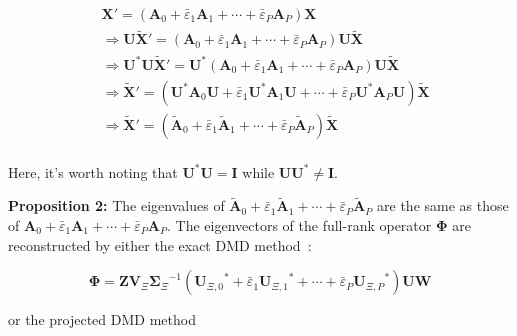 \begin{equation}
    \begin{aligned}
    & \mathbf{X'}=({\mathbf{A}_{0}}+{{\bar{\varepsilon}}_{1}}{\mathbf{A}_{1}}+\cdots+{{\bar{\varepsilon }}_{P}}{\mathbf{A}_{P}})\mathbf{X} \\ 
    & \Rightarrow \mathbf{U\tilde{X}'}=({\mathbf{A}_{0}}+{{\bar{\varepsilon }}_{1}}{\mathbf{A}_{1}}+\cdots+{{\bar{\varepsilon}}_{P}}{\mathbf{A}_{P}})\mathbf{U\tilde{X}} \\ 
    & \Rightarrow {\mathbf{U}^{*}}\mathbf{U\tilde{X}'}={\mathbf{U}^{*}}({\mathbf{A}_{0}}+{{\bar{\varepsilon }}_{1}}{\mathbf{A}_{1}}+\cdots+{{\bar{\varepsilon}}_{P}}{\mathbf{A}_{P}})\mathbf{U\tilde{X}} \\ 
    & \Rightarrow \mathbf{\tilde{X}'}=({\mathbf{U}^{*}}{\mathbf{A}_{0}}\mathbf{U}+{{\bar{\varepsilon}}_{1}}{\mathbf{U}^{*}}{\mathbf{A}_{1}}\mathbf{U}+\cdots+{{\bar{\varepsilon}}_{P}}{\mathbf{U}^{*}}{\mathbf{A}_{P}}\mathbf{U})\mathbf{\tilde{X}} \\ 
    & \Rightarrow \mathbf{\tilde{X}'}=({{\mathbf{\tilde{A}}}_{0}}+{{\bar{\varepsilon }}_{1}}{{\mathbf{\tilde{A}}}_{1}}+\cdots+{{\bar{\varepsilon}}_{P}}{{\mathbf{\tilde{A}}}_{P}})\mathbf{\tilde{X}} \\ 
    \end{aligned} \label{eqS9}
\end{equation}

Here, it’s worth noting that ${\mathbf{U}^\text{*}}\mathbf{U}=\mathbf{I}$ while $\mathbf{U}{\mathbf{U}^\text{*}}\ne \mathbf{I}$.

\textbf{Proposition 2:} The eigenvalues of $\mathbf{\tilde{A}}_{0}+{\bar{\varepsilon}_{1}}{\mathbf{\tilde{A}}_{1}}+\cdots+{\bar{\varepsilon}_{P}}{\mathbf{\tilde{A}}_{P}}$ are the same as those of ${\mathbf{A}_{0}}+{\bar{\varepsilon}_{1}}{\mathbf{A}_{1}}+\cdots+{\bar{\varepsilon}_{P}}{\mathbf{A}_{P}}$. The eigenvectors of the full-rank operator $\mathbf{\Phi}$ are reconstructed by either the exact DMD method~\cite{tu2013dynamic,brunton2022data}:

\begin{equation}
    \mathbf{\Phi}=\mathbf{Z}{\mathbf{V}_{\Xi}}{\mathbf{\Sigma}_{\Xi}}^{-1}({\mathbf{U}_{\Xi,0}}^\text{*}+{\bar{\varepsilon}_{1}}{\mathbf{U}_{\Xi,1}}^\text{*}+\cdots+{\bar{\varepsilon}_{P}}{\mathbf{U}_{\Xi,P}}^\text{*})\mathbf{UW} \label{eqS10}
\end{equation}

\noindent or the projected DMD method ~\cite{schmid2010dynamic}

